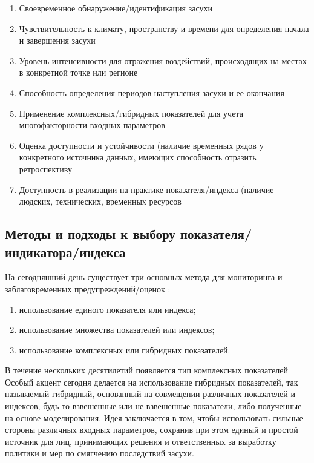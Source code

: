\begin{enumerate}
	\item Своевременное обнаружение/идентификация засухи 
	\item Чувствительность к климату, пространству и времени для определения начала и завершения засухи
	\item Уровень интенсивности для отражения воздействий, происходящих на местах в конкретной точке или регионе
	\item Способность определения периодов наступления засухи и ее окончания 
	\item Применение комплексных/гибридных показателей для учета многофакторности входных параметров
	\item Оценка доступности и устойчивости (наличие временных рядов у конкретного источника данных, имеющих способность отразить ретроспективу
	\item Доступность в реализации на практике показателя/индекса (наличие людских, технических, временных ресурсов
\end{enumerate}

\subsection{Методы и подходы к выбору показателя/индикатора/индекса}

На сегодняшний день существует три основных метода для мониторинга и заблаговременных предупреждений/оценок \cite{Handbook2016}:

\begin{enumerate}
	\item использование единого показателя или индекса; 
	\item использование множества показателей или индексов; 
	\item использование комплексных или гибридных показателей.
\end{enumerate}

В течение нескольких десятилетий появляется тип комплексных показателей Особый акцент сегодня делается на использование гибридных показателей, так называемый гибридный, основанный на совмещении различных показателей и индексов, будь то взвешенные или не взвешенные показатели, либо полученные на основе моделирования. Идея заключается в том, чтобы использовать сильные стороны различных входных параметров, сохранив при этом единый и простой источник для лиц, принимающих решения и ответственных за выработку политики и мер по смягчению последствий засухи.

